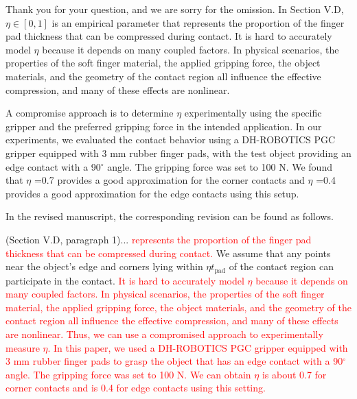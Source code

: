 \documentclass[journal]{IEEEtran}
\newcommand{\rev}[1]{\textcolor{red}{#1}}
\begin{document}
Thank you for your question, and we are sorry for the omission. 
In Section V.D, $\eta \in [0,1]$ is an empirical parameter that represents the proportion of the finger pad thickness that can be compressed during contact.
It is hard to accurately model $\eta$ because it depends on many coupled factors. In physical scenarios, the properties of the soft finger material, the applied gripping force, the object materials, and the geometry of the contact region all influence the effective compression, and many of these effects are nonlinear. 

A compromise approach is to determine 
$\eta$ experimentally using the specific gripper and the preferred gripping force in the intended application. In our experiments, we evaluated the contact behavior using a DH-ROBOTICS PGC gripper equipped with 3 mm rubber finger pads, with the test object providing an edge contact with a 90$^\circ$ angle. The gripping force was set to 100 N. We found that 
$\eta$ =0.7 provides a good approximation for the corner contacts and $\eta$ =0.4 provides a good approximation for the edge contacts using this setup.

In the revised manuscript, the corresponding revision can be found as follows.

(Section V.D, paragraph 1)...
\rev{represents the proportion of the finger pad thickness that can be compressed during contact.} We assume that any points near the object's edge and corners lying within $\eta t_\mathrm{pad}$ of the contact region can participate in the contact. 
\rev{It is hard to accurately model $\eta$ because it depends on many coupled factors. In physical scenarios, the properties of the soft finger material, the applied gripping force, the object materials, and the geometry of the contact region all influence the effective compression, and many of these effects are nonlinear. Thus, we can use a compromised approach to experimentally measure $\eta$. In this paper, we used a DH-ROBOTICS PGC gripper equipped with 3 mm rubber finger pads to grasp the object that has an edge contact with a 90$^\circ$ angle. The gripping force was set to 100 N. We can obtain $\eta$ is about 0.7 for corner contacts and is 0.4 for edge contacts using this setting.}\\

\end{document}
